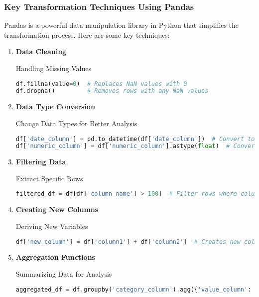 \documentclass[aspectratio=169]{beamer}
\begin{document}
\begin{frame}[fragile]
    \frametitle{Key Transformation Techniques Using Pandas}
    Pandas is a powerful data manipulation library in Python that simplifies the transformation process. Here are some key techniques:
    
    \begin{enumerate}
        \item \textbf{Data Cleaning}
          \begin{block}{Handling Missing Values}
              \begin{lstlisting}[language=Python]
df.fillna(value=0)  # Replaces NaN values with 0
df.dropna()         # Removes rows with any NaN values
              \end{lstlisting}
          \end{block}
          
        \item \textbf{Data Type Conversion}
          \begin{block}{Change Data Types for Better Analysis}
              \begin{lstlisting}[language=Python]
df['date_column'] = pd.to_datetime(df['date_column'])  # Convert to datetime
df['numeric_column'] = df['numeric_column'].astype(float)  # Convert to float
              \end{lstlisting}
          \end{block}
          
        \item \textbf{Filtering Data}
          \begin{block}{Extract Specific Rows}
              \begin{lstlisting}[language=Python]
filtered_df = df[df['column_name'] > 100]  # Filter rows where column_name > 100
              \end{lstlisting}
          \end{block}
          
        \item \textbf{Creating New Columns}
          \begin{block}{Deriving New Variables}
              \begin{lstlisting}[language=Python]
df['new_column'] = df['column1'] + df['column2']  # Creates new column as sum of two existing columns
              \end{lstlisting}
          \end{block}
          
        \item \textbf{Aggregation Functions}
          \begin{block}{Summarizing Data for Analysis}
              \begin{lstlisting}[language=Python]
aggregated_df = df.groupby('category_column').agg({'value_column': 'sum'})  # Summing values
              \end{lstlisting}
          \end{block}
          

\end{enumerate}
\end{frame}
\end{document}
